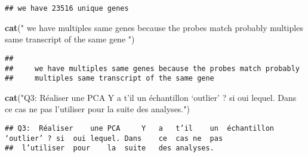 \documentclass[]{article}
\newenvironment{Shaded}{\begin{snugshade}}{\end{snugshade}}
\newcommand{\KeywordTok}[1]{\textcolor[rgb]{0.13,0.29,0.53}{\textbf{#1}}}
\newcommand{\StringTok}[1]{\textcolor[rgb]{0.31,0.60,0.02}{#1}}
\newcommand{\NormalTok}[1]{#1}
\begin{document}
\begin{verbatim}
## we have 23516 unique genes
\end{verbatim}

\begin{Shaded}
\begin{Highlighting}[]
\KeywordTok{cat}\NormalTok{(}\StringTok{"}
\StringTok{    we have multiples same genes because the probes match probably}
\StringTok{    multiples same transcript of the same gene}
\StringTok{"}\NormalTok{)}
\end{Highlighting}
\end{Shaded}

\begin{verbatim}
## 
##     we have multiples same genes because the probes match probably
##     multiples same transcript of the same gene
\end{verbatim}

\begin{Shaded}
\begin{Highlighting}[]
\KeywordTok{cat}\NormalTok{(}\StringTok{"Q3:  Réaliser  une PCA     Y   a   t’il    un  échantillon ‘outlier’ ? si  oui lequel. Dans    ce  cas ne  pas }
\StringTok{ l’utiliser pour    la  suite   des analyses."}\NormalTok{)}
\end{Highlighting}
\end{Shaded}

\begin{verbatim}
## Q3:  Réaliser    une PCA     Y   a   t’il    un  échantillon ‘outlier’ ? si  oui lequel. Dans    ce  cas ne  pas 
##  l’utiliser  pour    la  suite   des analyses.
\end{verbatim}
\end{document}
